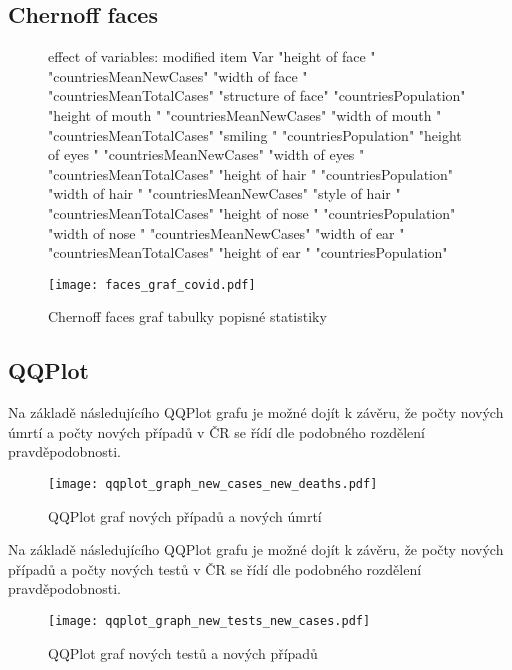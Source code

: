 \documentclass[a4paper, 12pt]{article}
\begin{document}
\subsection{Chernoff faces}
\begin{figure}[H]
\small
\centering

\begin{Schunk}
\begin{Soutput}
effect of variables:
 modified item       Var                      
 "height of face   " "countriesMeanNewCases"  
 "width of face    " "countriesMeanTotalCases"
 "structure of face" "countriesPopulation"    
 "height of mouth  " "countriesMeanNewCases"  
 "width of mouth   " "countriesMeanTotalCases"
 "smiling          " "countriesPopulation"    
 "height of eyes   " "countriesMeanNewCases"  
 "width of eyes    " "countriesMeanTotalCases"
 "height of hair   " "countriesPopulation"    
 "width of hair   "  "countriesMeanNewCases"  
 "style of hair   "  "countriesMeanTotalCases"
 "height of nose  "  "countriesPopulation"    
 "width of nose   "  "countriesMeanNewCases"  
 "width of ear    "  "countriesMeanTotalCases"
 "height of ear   "  "countriesPopulation"    
\end{Soutput}
\end{Schunk}
\texttt{[image: faces\_graf\_covid.pdf]}
\caption{Chernoff faces graf tabulky popisné statistiky}
\end{figure}
\clearpage

\subsection{QQPlot}

Na základě následujícího QQPlot grafu je možné dojít k závěru, že počty nových
úmrtí a počty nových případů v ČR se řídí dle podobného rozdělení pravděpodobnosti.

\begin{figure}[H]
\centering

\texttt{[image: qqplot\_graph\_new\_cases\_new\_deaths.pdf]}
\caption{QQPlot graf nových případů a nových úmrtí}
\end{figure}
\clearpage

Na základě následujícího QQPlot grafu je možné dojít k závěru, že počty nových
případů a počty nových testů v ČR se řídí dle podobného rozdělení pravděpodobnosti.

\begin{figure}[H]
\centering

\texttt{[image: qqplot\_graph\_new\_tests\_new\_cases.pdf]}
\caption{QQPlot graf nových testů a nových případů}

\end{figure}
\clearpage
\end{document}
